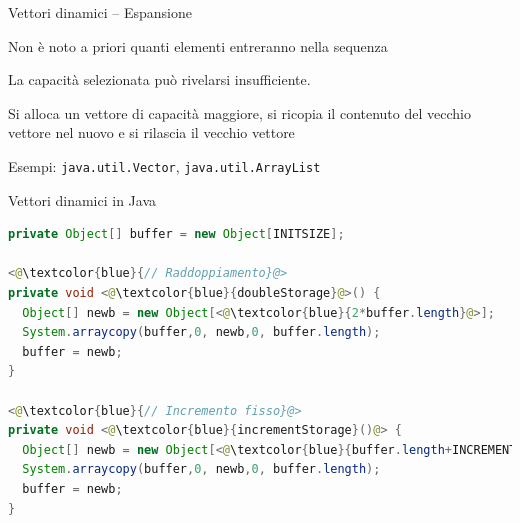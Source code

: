\begin{frame}{Vettori dinamici -- Espansione}


\vspace{-9pt}
\begin{myboxtitle}[Problema]
\BI
\item Non è noto a priori quanti elementi entreranno nella sequenza
\item La capacità selezionata può rivelarsi insufficiente.
\EI
\end{myboxtitle}

\begin{myboxtitle}[Soluzione]
\BI
\item Si alloca un vettore di capacità maggiore, si ricopia il contenuto del vecchio vettore nel nuovo e si rilascia il vecchio vettore
\item Esempi: \texttt{java.util.Vector}, \texttt{java.util.ArrayList}
\EI
\end{myboxtitle}


\end{frame}

\begin{frame}{Vettori dinamici in Java}

\begin{lstlisting}[language=java]
private Object[] buffer = new Object[INITSIZE];

<@\textcolor{blue}{// Raddoppiamento}@>
private void <@\textcolor{blue}{doubleStorage}@>() {
  Object[] newb = new Object[<@\textcolor{blue}{2*buffer.length}@>];
  System.arraycopy(buffer,0, newb,0, buffer.length);
  buffer = newb;
}

<@\textcolor{blue}{// Incremento fisso}@>
private void <@\textcolor{blue}{incrementStorage}()@> {
  Object[] newb = new Object[<@\textcolor{blue}{buffer.length+INCREMENT}@>];
  System.arraycopy(buffer,0, newb,0, buffer.length);
  buffer = newb;
}
\end{lstlisting}
	
\end{frame}



